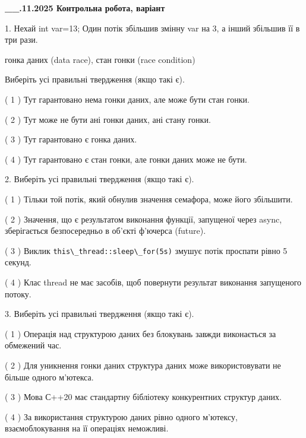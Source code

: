 \documentclass[12pt, ukrainian]{article}
\def\code#1{\Verb!#1!}
\begin{document}
\newpage
\begin {large}

\textbf{\_\_.11.2025 Контрольна робота, варіант  }\par


{
1. Нехай int var=13; Один потік збільшив змінну var на 3, а інший збільшив її в три рази.

гонка даних (data race), стан гонки (race condition)

Виберіть усі правильні твердження (якщо такі є).\par
\vspace{2mm}
( 1 ) Тут гарантовано нема гонки даних, але може бути стан гонки.%

( 2 ) Тут може не бути ані гонки даних, ані стану гонки.%

( 3 ) Тут гарантовано є гонка даних.%

( 4 ) Тут гарантовано є стан гонки, але гонки даних може не бути.%


2. Виберіть усі правильні твердження (якщо такі є).\par
\vspace{2mm}

( 1 ) Тільки той потік, який обнулив значення семафора, може його збільшити.%

( 2 ) Значення, що є результатом виконання функції, запущеної через async, зберігається безпосередньо в об’єкті ф’ючерса (future).%

( 3 ) Виклик \code{this\_thread::sleep\_for(5s)} змушує потік проспати рівно 5 секунд.%

( 4 ) Клас thread не має засобів, щоб повернути результат виконання запущеного потоку.%


3. Виберіть усі правильні твердження (якщо такі є).\par
\vspace{2mm}

( 1 ) Операція над структурою даних без блокувань завжди виконається за обмежений час.%

( 2 ) Для уникнення гонки даних структура даних може використовувати не більше одного м’ютекса.%

( 3 ) Мова С++20 має стандартну бібліотеку конкурентних структур даних.%

( 4 ) За використання структурою даних рівно одного м’ютексу, взаємоблокування на її операціях неможливі.%


}
\end{large}
\end{document}
